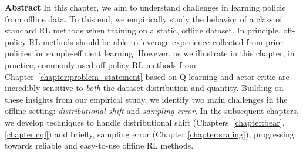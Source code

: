 \documentclass[../thesis.tex]{subfiles}
\begin{document}

% 

% 
% 
% 
% 
% 
% 


\vspace{-0.4cm}
\begin{AIbox}{\large{\textbf{Abstract}}}
\vspace{4mm}
In this chapter, we aim to understand challenges in learning policie from offline data. To this end, we empirically study the behavior of a class of standard RL methods when training on a static, offline dataset. In principle, off-policy RL methods should be able to leverage experience collected from prior policies for sample-efficient learning. However, as we illustrate in this chapter, in practice, commonly used off-policy RL methods from Chapter~\ref{chapter:problem_statement} based on Q-learning and actor-critic are incredibly sensitive to \emph{both} the dataset distribution and quantity. Building on these insights from our empirical study, we identify two main challenges in the offline setting: \emph{distributional shift} and \emph{sampling error}. In the subsequent chapters, we develop techniques to handle distributional shift (Chapters~\ref{chapter:bear}, \ref{chapter:cql}) and briefly, sampling error (Chapter \ref{chapter:scaling}), progressing towards reliable and easy-to-use offline RL methods.  
\vspace{2mm}
\end{AIbox}
    
\end{document}
